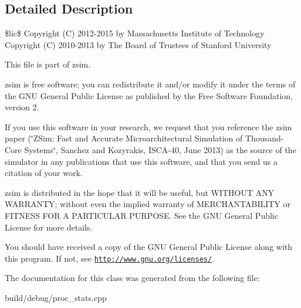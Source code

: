 \subsection{Detailed Description}
\$lic\$ Copyright (C) 2012-\/2015 by Massachusetts Institute of Technology Copyright (C) 2010-\/2013 by The Board of Trustees of Stanford University

This file is part of zsim.

zsim is free software; you can redistribute it and/or modify it under the terms of the G\-N\-U General Public License as published by the Free Software Foundation, version 2.

If you use this software in your research, we request that you reference the zsim paper (\char`\"{}\-Z\-Sim\-: Fast and Accurate Microarchitectural Simulation of
\-Thousand-\/\-Core Systems\char`\"{}, Sanchez and Kozyrakis, I\-S\-C\-A-\/40, June 2013) as the source of the simulator in any publications that use this software, and that you send us a citation of your work.

zsim is distributed in the hope that it will be useful, but W\-I\-T\-H\-O\-U\-T A\-N\-Y W\-A\-R\-R\-A\-N\-T\-Y; without even the implied warranty of M\-E\-R\-C\-H\-A\-N\-T\-A\-B\-I\-L\-I\-T\-Y or F\-I\-T\-N\-E\-S\-S F\-O\-R A P\-A\-R\-T\-I\-C\-U\-L\-A\-R P\-U\-R\-P\-O\-S\-E. See the G\-N\-U General Public License for more details.

You should have received a copy of the G\-N\-U General Public License along with this program. If not, see \href{http://www.gnu.org/licenses/}{\tt http\-://www.\-gnu.\-org/licenses/}. 

The documentation for this class was generated from the following file\-:\begin{DoxyCompactItemize}
\item 
build/debug/proc\-\_\-stats.\-cpp\end{DoxyCompactItemize}
